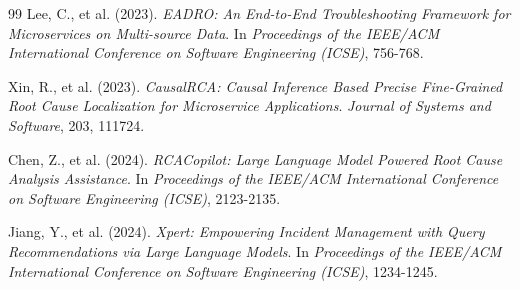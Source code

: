 \documentclass[conference]{IEEEtran}
\begin{document}
\begin{thebibliography}{99}
Lee, C., et al. (2023).
\textit{EADRO: An End-to-End Troubleshooting Framework for Microservices on Multi-source Data}.
In \textit{Proceedings of the IEEE/ACM International Conference on Software Engineering (ICSE)}, 756-768.

Xin, R., et al. (2023).
\textit{CausalRCA: Causal Inference Based Precise Fine-Grained Root Cause Localization for Microservice Applications}.
\textit{Journal of Systems and Software}, 203, 111724.

Chen, Z., et al. (2024).
\textit{RCACopilot: Large Language Model Powered Root Cause Analysis Assistance}.
In \textit{Proceedings of the IEEE/ACM International Conference on Software Engineering (ICSE)}, 2123-2135.

Jiang, Y., et al. (2024).
\textit{Xpert: Empowering Incident Management with Query Recommendations via Large Language Models}.
In \textit{Proceedings of the IEEE/ACM International Conference on Software Engineering (ICSE)}, 1234-1245.

\end{thebibliography}
\end{document}
